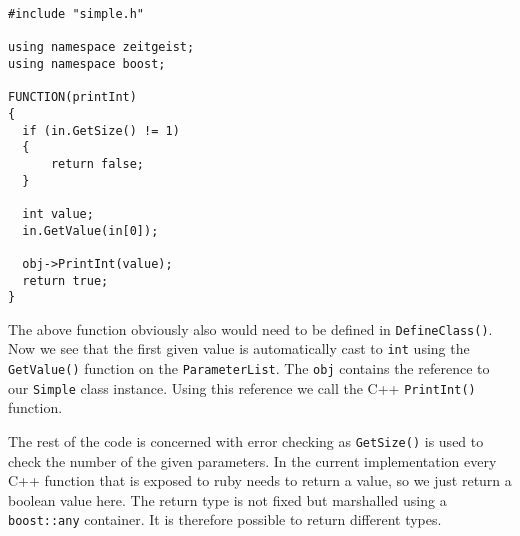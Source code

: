 \begin{verbatim}
#include "simple.h"

using namespace zeitgeist;
using namespace boost;

FUNCTION(printInt)
{
  if (in.GetSize() != 1)
  {
      return false;
  }

  int value;
  in.GetValue(in[0]);

  obj->PrintInt(value);
  return true;
}
\end{verbatim}

The above function obviously also would need to be defined in
\texttt{DefineClass()}. Now we see that the first given value 
is automatically cast to \texttt{int} using the \texttt{GetValue()}
function on the \texttt{ParameterList}. The \texttt{obj} contains the
reference to our \texttt{Simple} class instance. Using this reference
we call the C++ \texttt{PrintInt()} function.

The rest of the code is concerned with error checking as
\texttt{GetSize()} is used to check the number of the given parameters. 
In the current implementation every C++ function that is exposed to
ruby needs to return a value, so we just return a boolean value
here. The return type is not fixed but marshalled using a
\texttt{boost::any} container. It is therefore possible to return
different types.

